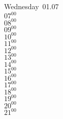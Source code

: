 \documentclass[11pt,a4paper]{book}\usepackage[]{graphicx}\usepackage[]{color}
\begin{document}
\begin{tcolorbox}
Wednesday~01.07\\
{ 
  $07^{00}$\\
$08^{00}$\\
$09^{00}$\\
$10^{00}$\\
$11^{00}$\\
$12^{00}$\\
$13^{00}$\\
$14^{00}$\\
$15^{00}$\\
$16^{00}$\\
$17^{00}$\\
$18^{00}$\\
$19^{00}$\\
$20^{00}$\\
$21^{00}$}\\

\end{tcolorbox}
\clearpage
\end{document}
